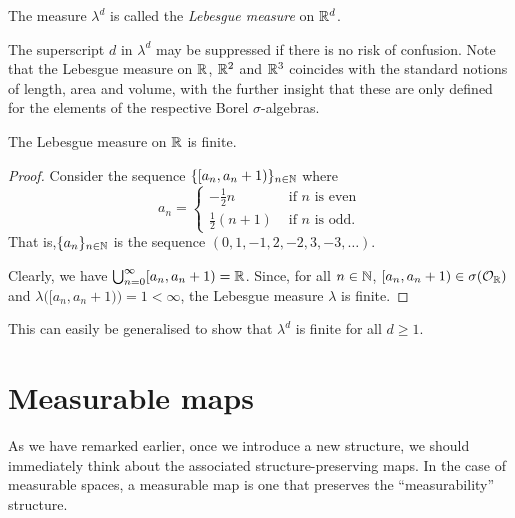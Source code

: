 \begin{definition}
The measure $\lambda^d$ is called the \emph{Lebesgue measure} on $\mathbb{R}^d$.
\end{definition}

The superscript $d$ in $\lambda^d$ may be suppressed if there is no risk of confusion. Note that the Lebesgue measure on $\mathbb{R}$, $\mathbb{R}^2$ and $\mathbb{R}^3$ coincides with the standard notions of length, area and volume, with the further insight that these are only defined for the elements of the respective Borel $\sigma$-algebras.

\begin{proposition}
The Lebesgue measure on $\mathbb{R}$ is finite.
\end{proposition}
\begin{proof}
Consider the sequence $\{[a_n,a_n+1)\}_{n\in\mathbb{N}}$ where
\begin{equation*}
a_n =
\begin{cases}
-\tfrac{1}{2}n & \text{ if $n$ is even}\\
\tfrac{1}{2}(n+1) & \text{ if $n$ is odd}.
\end{cases}
\end{equation*}
That is,$\{a_n\}_{n\in\mathbb{N}}$ is the sequence $(0,1,-1,2,-2,3,-3,\ldots)$.

\begin{center}
\end{center}

Clearly, we have $\bigcup_{n=0}^{\infty}[a_n,a_n+1) = \mathbb{R}$. Since, for all $n\in \mathbb{N}$, $[a_n,a_n+1)\in\sigma(\mathcal{O}_{\mathbb{R}})$ and $\lambda\bigl([a_n,a_n+1)\bigr) = 1<\infty$, the Lebesgue measure $\lambda$ is finite.
\end{proof}

This can easily be generalised to show that $\lambda^d$ is finite for
all $d\geq 1$.

\section{Measurable maps}

As we have remarked earlier, once we introduce a new structure, we
should immediately think about the associated structure-preserving
maps. In the case of measurable spaces, a measurable map is one that
preserves the ``measurability'' structure.

